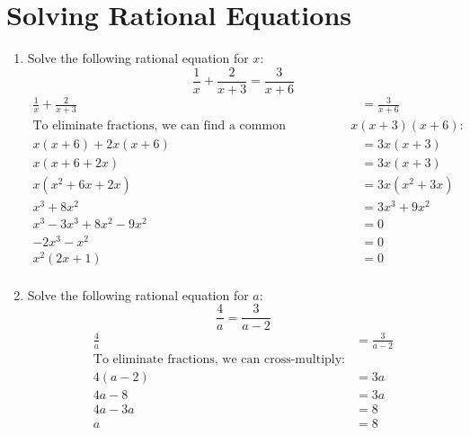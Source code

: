 \documentclass{article}
\begin{document}
\section*{Solving Rational Equations}
\begin{enumerate}[resume]
    \item Solve the following rational equation for $x$:
    \begin{equation*}
        \frac{1}{x} + \frac{2}{x + 3} = \frac{3}{x + 6}
    \end{equation*}
\begin{align*}
\frac{1}{x} + \frac{2}{x + 3} &= \frac{3}{x + 6} \\
\text{To eliminate fractions, we can find a common denominator, which is } x(x + 3)(x + 6): \\
x(x + 6) + 2x(x + 6) &= 3x(x + 3) \\
x(x + 6 + 2x) &= 3x(x + 3) \\
x(x^2 + 6x + 2x) &= 3x(x^2 + 3x) \\
x^3 + 8x^2 &= 3x^3 + 9x^2 \\
x^3 - 3x^3 + 8x^2 - 9x^2 &= 0 \\
-2x^3 - x^2 &= 0 \\
x^2(2x + 1) &= 0 \\
\end{align*}

    
    \item Solve the following rational equation for $a$:
    \begin{equation*}
        \frac{4}{a} = \frac{3}{a - 2}
    \end{equation*}
    \begin{align*}
\frac{4}{a} &= \frac{3}{a - 2} \\
\text{To eliminate fractions, we can cross-multiply:} \\
4(a - 2) &= 3a \\
4a - 8 &= 3a \\
4a - 3a &= 8 \\
a &= 8
\end{align*}

\end{enumerate}
\newpage 
\end{document}
